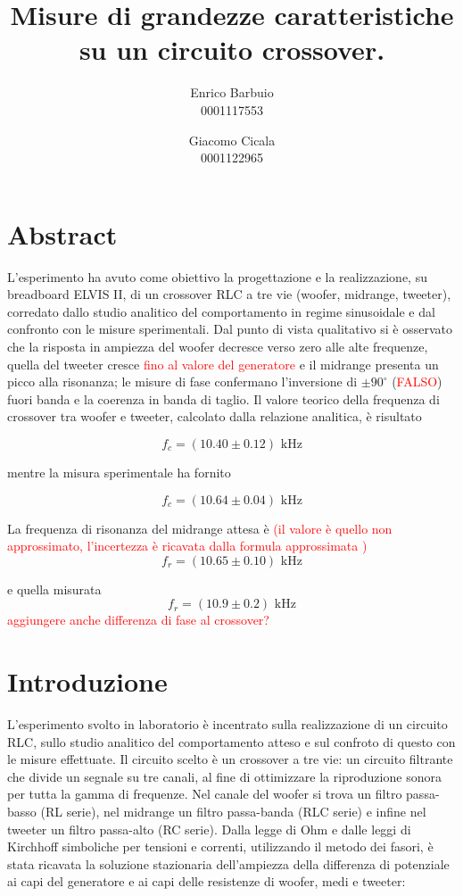 \documentclass[12pt,italian]{article}
\title{Misure di grandezze caratteristiche su un circuito crossover.}
\author{Enrico Barbuio \\ 0001117553 \and Giacomo Cicala \\ 0001122965}
\date{\err{data}}
\newcommand{\err}[1]{\textcolor{red}{#1}}
\begin{document}
\maketitle
\section*{Abstract}
L'esperimento ha avuto come obiettivo la progettazione e la realizzazione, su
breadboard ELVIS II, di un crossover RLC a tre vie (woofer, midrange, tweeter),
corredato dallo studio analitico del comportamento in regime sinusoidale e dal
confronto con le misure sperimentali. Dal punto di vista qualitativo si è
osservato che la risposta in ampiezza del woofer decresce verso zero alle alte
frequenze, quella del tweeter cresce \err{fino al valore del generatore} e il
midrange presenta un picco alla risonanza; le misure di fase confermano
l'inversione di $ \pm 90^\circ $ (\err{FALSO}) fuori banda e la coerenza in
banda di taglio. Il valore teorico della frequenza di crossover tra woofer e
tweeter, calcolato dalla relazione analitica, è risultato

\begin{equation*}
	f_{c} = (10.40 \pm 0.12)  \text{ kHz}
\end{equation*}

\noindent
mentre la misura sperimentale ha fornito

\begin{equation*}
	f_{c} = (10.64 \pm 0.04) \text{ kHz}
\end{equation*}

\noindent
La frequenza di risonanza del midrange attesa è \err{(il valore è quello non approssimato, l'incertezza è ricavata dalla formula approssimata )}
\begin{equation*}
	f_{r} = (10.65 \pm 0.10)  \text{ kHz}
\end{equation*}

\noindent
e quella misurata
\begin{equation*}
	f_{r} = (10.9 \pm 0.2)  \text{ kHz}
\end{equation*}
\err{aggiungere anche differenza di fase al crossover?}

\section*{Introduzione}

L'esperimento svolto in laboratorio è incentrato sulla realizzazione di un
circuito RLC, sullo studio analitico del comportamento atteso e sul confroto di
questo con le misure effettuate. Il circuito scelto è un crossover a tre vie:
un circuito filtrante che divide un segnale su tre canali, al fine di
ottimizzare la riproduzione sonora per tutta la gamma di frequenze. Nel canale
del woofer si trova un filtro passa-basso (RL serie), nel midrange un filtro
passa-banda (RLC serie) e infine nel tweeter un filtro passa-alto (RC serie).
Dalla legge di Ohm e dalle leggi di Kirchhoff simboliche per tensioni e
correnti, utilizzando il metodo dei fasori, è stata ricavata la soluzione
stazionaria dell'ampiezza della differenza di potenziale ai capi del generatore
e ai capi delle resistenze di woofer, medi e tweeter:
\end{document}
